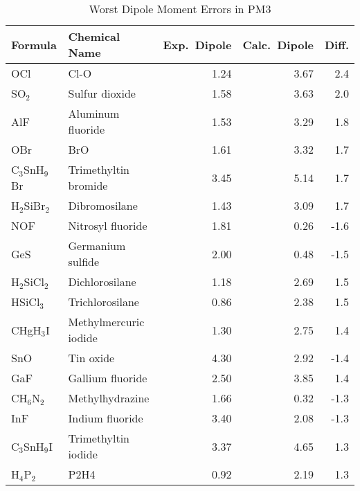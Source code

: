 \begin{table}
\caption{\label{wedpm3}Worst Dipole Moment Errors in PM3}
\compresstable
\begin{center}
\begin{tabular}{llrrr}
 Formula & Chemical Name & Exp.\ Dipole       & Calc.\ Dipole       & Diff.\\
 \hline
 OCl                  & Cl-O                                   &    1.24   &     3.67   &    2.4\\
 SO$_2$               & Sulfur dioxide                         &    1.58   &     3.63   &    2.0\\
 AlF                  & Aluminum fluoride                      &    1.53   &     3.29   &    1.8\\
 OBr                  & BrO                                    &    1.61   &     3.32   &    1.7\\
 C$_3$SnH$_9$Br       & Trimethyltin bromide                   &    3.45   &     5.14   &    1.7\\
 H$_2$SiBr$_2$        & Dibromosilane                          &    1.43   &     3.09   &    1.7\\
 NOF                  & Nitrosyl fluoride                      &    1.81   &     0.26   &   -1.6\\
 GeS                  & Germanium sulfide                      &    2.00   &     0.48   &   -1.5\\
 H$_2$SiCl$_2$        & Dichlorosilane                         &    1.18   &     2.69   &    1.5\\
 HSiCl$_3$            & Trichlorosilane                        &    0.86   &     2.38   &    1.5\\
 CHgH$_3$I            & Methylmercuric iodide                  &    1.30   &     2.75   &    1.4\\
 SnO                  & Tin oxide                              &    4.30   &     2.92   &   -1.4\\
 GaF                  & Gallium fluoride                       &    2.50   &     3.85   &    1.4\\
 CH$_6$N$_2$          & Methylhydrazine                        &    1.66   &     0.32   &   -1.3\\
 InF                  & Indium fluoride                        &    3.40   &     2.08   &   -1.3\\
 C$_3$SnH$_9$I        & Trimethyltin iodide                    &    3.37   &     4.65   &    1.3\\
 H$_4$P$_2$           & P2H4                                   &    0.92   &     2.19   &    1.3\\

\end{tabular}
\end{center}
\end{table}
